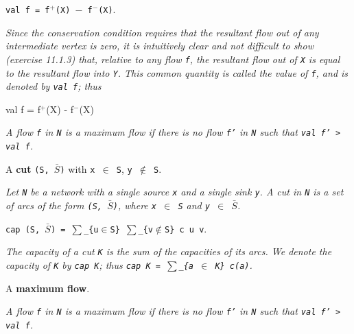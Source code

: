 \begin{definition}[\texttt{val f = f$^{+}$(X) $-$ f$^{-}$(X)}]
\label{Networks.Network.val}
\leanok
{}
\texttt{val f = f$^{+}$(X) $-$ f$^{-}$(X)}.

\emph{Since the conservation condition
requires that the resultant flow out of any intermediate vertex is zero, it is
intuitively clear and not difficult to show (exercise 11.1.3) that, relative to any
flow \texttt{f}, the resultant flow out of \texttt{X} is equal to the resultant flow
into \texttt{Y}.
This common quantity is called the value of \texttt{f}, and is denoted by \texttt{val
f}; thus}

val f = f$^{+}$(X) - f$^{-}$(X)

\emph{A flow \texttt{f} in \texttt{N} is a maximum flow if there is no flow \texttt{f'}
in \texttt{N} such that
\texttt{val f' > val f}.}
\end{definition}

\begin{definition}
\label{Networks.Network.IsCut}
\leanok
{}
A \textbf{cut} \texttt{(S, $\bar{S}$)} with \texttt{x $\in$ S}, \texttt{y $\notin$ S}.

\emph{Let \texttt{N} be a network with a single
source \texttt{x} and a single sink \texttt{y}. A cut in \texttt{N} is a set of arcs of
the form
\texttt{(S, $\bar{S}$)}, where \texttt{x $\in$ S} and \texttt{y $\in$ $\bar{S}$}.}
\end{definition}

\begin{definition}[\texttt{cap (S, $\bar{S}$) = $\sum$\_\{u$\in$S\} $\sum$\_\{v$\notin$S\} c u v}]
\label{Networks.Network.capOf}
\leanok
{}
\texttt{cap (S, $\bar{S}$) = $\sum$\_\{u$\in$S\} $\sum$\_\{v$\notin$S\} c u v}.

\emph{The capacity of a cut \texttt{K} is the sum of
the capacities of its arcs. We denote the capacity of \texttt{K} by \texttt{cap K}; thus
\texttt{cap K = $\sum$\_\{a $\in$ K\} c(a)}.}
\end{definition}

\begin{definition}
\label{Networks.Network.IsMaxFlow}
\leanok
{}
A \textbf{maximum flow}.

\emph{A flow \texttt{f} in \texttt{N} is a maximum flow if
there is no flow \texttt{f'} in \texttt{N} such that \texttt{val f' > val f}.}
\end{definition}

